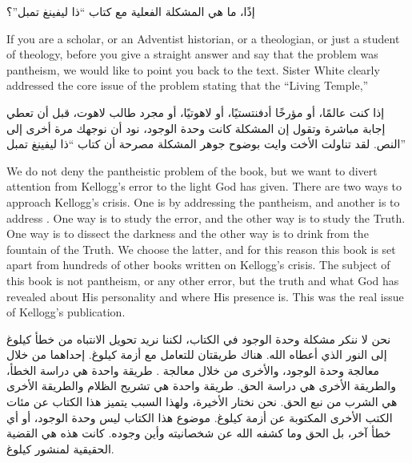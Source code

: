 إذًا، ما هي المشكلة الفعلية مع كتاب “ذا ليفينغ تمبل”؟


If you are a scholar, or an Adventist historian, or a theologian, or just a student of theology, before you give a straight answer and say that the problem was pantheism, we would like to point you back to the text. Sister White clearly addressed the core issue of the problem stating that the “Living Temple,” 


إذا كنت عالمًا، أو مؤرخًا أدفنتستيًا، أو لاهوتيًا، أو مجرد طالب لاهوت، قبل أن تعطي إجابة مباشرة وتقول إن المشكلة كانت وحدة الوجود، نود أن نوجهك مرة أخرى إلى النص. لقد تناولت الأخت وايت بوضوح جوهر المشكلة مصرحة أن كتاب “ذا ليفينغ تمبل” 


We do not deny the pantheistic problem of the book, but we want to divert attention from Kellogg’s error to the light God has given. There are two ways to approach Kellogg’s crisis. One is by addressing the pantheism, and another is to address . One way is to study the error, and the other way is to study the Truth. One way is to dissect the darkness and the other way is to drink from the fountain of the Truth. We choose the latter, and for this reason this book is set apart from hundreds of other books written on Kellogg’s crisis. The subject of this book is not pantheism, or any other error, but the truth and what God has revealed about His personality and where His presence is. This was the real issue of Kellogg’s publication.


نحن لا ننكر مشكلة وحدة الوجود في الكتاب، لكننا نريد تحويل الانتباه من خطأ كيلوغ إلى النور الذي أعطاه الله. هناك طريقتان للتعامل مع أزمة كيلوغ. إحداهما من خلال معالجة وحدة الوجود، والأخرى من خلال معالجة . طريقة واحدة هي دراسة الخطأ، والطريقة الأخرى هي دراسة الحق. طريقة واحدة هي تشريح الظلام والطريقة الأخرى هي الشرب من نبع الحق. نحن نختار الأخيرة، ولهذا السبب يتميز هذا الكتاب عن مئات الكتب الأخرى المكتوبة عن أزمة كيلوغ. موضوع هذا الكتاب ليس وحدة الوجود، أو أي خطأ آخر، بل الحق وما كشفه الله عن شخصانيته وأين وجوده. كانت هذه هي القضية الحقيقية لمنشور كيلوغ.


